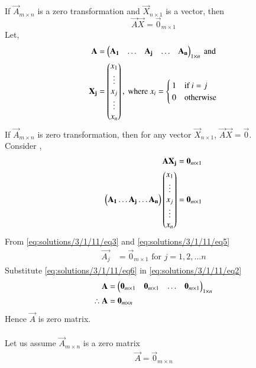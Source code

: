 If $\vec{A}_{m \times n}$ is a zero transformation and $\vec{X}_{n \times 1}$ is a vector, then 
\begin{equation}\label{eq:solutions/3/1/11/eq1}
	\vec{A}\vec{X} = \vec{0}_{m \times 1}	
\end{equation}
Let,
\begin{align}
	\label{eq:solutions/3/1/11/eq2}\mathbf{A} &= \begin{pmatrix}\mathbf{A_1} & \dots & \mathbf{A_j} & \dots & \mathbf{A_n}\end{pmatrix}_{1\times n} \text{ and }\\
	\label{eq:solutions/3/1/11/eq3}\mathbf{X_j} &= \begin{pmatrix}x_1\\ \vdots \\x_j\\ \vdots\\x_n\end{pmatrix}, \text{ where }
	x_i = 
	\begin{cases}
		1 & \text{if $i=j$}\\
		0 & \text{otherwise}
	\end{cases}
\end{align}
If $\vec{A}_{m \times n}$ is zero transformation, then for any vector $\vec{X}_{n \times 1}$, $\vec{A}\vec{X} = \vec{0}$.\\ Consider ,
\begin{align}
	\label{eq:solutions/3/1/11/eq4}\mathbf{A}{\mathbf{X_j}} &= \mathbf{0}_{m \times 1}\\
	\label{eq:solutions/3/1/11/eq5}\begin{pmatrix}\mathbf{A_1}\dots\mathbf{A_j}\dots\mathbf{A_n}\end{pmatrix}
	\begin{pmatrix}x_1\\\vdots\\x_j\\\vdots\\x_n\end{pmatrix} &= \mathbf{0}_{m \times 1}
\end{align}
From \eqref{eq:solutions/3/1/11/eq3} and \eqref{eq:solutions/3/1/11/eq5}
\begin{align}
	\label{eq:solutions/3/1/11/eq6}\vec{A_j} &= \vec{0}_{m\times1} \text{ for $j=1,2,...n$}
\end{align}
Substitute \eqref{eq:solutions/3/1/11/eq6} in \eqref{eq:solutions/3/1/11/eq2}
\begin{align}
	\mathbf{A} &= \begin{pmatrix}\mathbf{0}_{m \times 1} & \mathbf{0}_{m \times 1} & \dots & \mathbf{0}_{m \times 1}\end{pmatrix}_{1 \times n}\\
	\label{eq:solutions/3/1/11/eq7}\therefore \mathbf{A} &= \mathbf{0}_{m \times n}
\end{align}
Hence $\vec{A}$ is zero matrix.\\
\\
Let us assume $\vec{A}_{m \times n}$ is a zero matrix
\begin{align}
	\label{eq:solutions/3/1/11/eq8}\vec{A} = \vec{0}_{m \times n}
\end{align}
